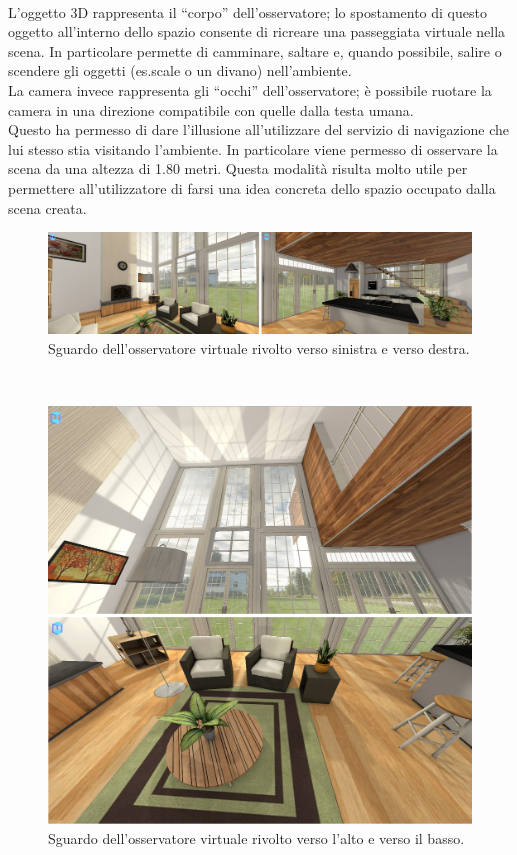 \\
L’oggetto 3D rappresenta il “corpo” dell’osservatore; lo spostamento di questo oggetto all’interno dello spazio consente di ricreare una passeggiata virtuale nella scena.
In particolare permette di camminare, saltare e, quando possibile, salire o scendere gli oggetti (es.scale o un divano) nell’ambiente.
\\
La camera invece rappresenta gli “occhi” dell’osservatore; è possibile ruotare la camera in una direzione compatibile con quelle dalla testa umana. 
\\
Questo ha permesso di dare l’illusione all’utilizzare del servizio di navigazione che lui stesso stia visitando l’ambiente.
In particolare viene permesso di osservare la scena da una altezza di 1.80 metri. Questa modalità risulta molto utile per permettere all’utilizzatore di farsi una idea concreta dello spazio occupato dalla scena creata.
\\
\begin{figure}[htb]
 \centering
 \includegraphics[width=1\linewidth]{images/chapter_navigazione_scena/vis_sin_des.png}\hfill
 \caption[Esempio 1 di osservazione virtuale]{Sguardo dell'osservatore virtuale rivolto verso sinistra e verso destra.}
 \label{fig:navigazione_scena_vis_sin_des}
\end{figure}
\\
\begin{figure}[htb]
 \centering
 \includegraphics[width=1\linewidth]{images/chapter_navigazione_scena/vis_alta_bassa.png}\hfill
 \caption[Esempio 2 di osservazione virtuale]{Sguardo dell'osservatore virtuale rivolto verso l'alto e verso il basso.}
 \label{fig:navigazione_scena_vis_alta_bassa}
\end{figure}
